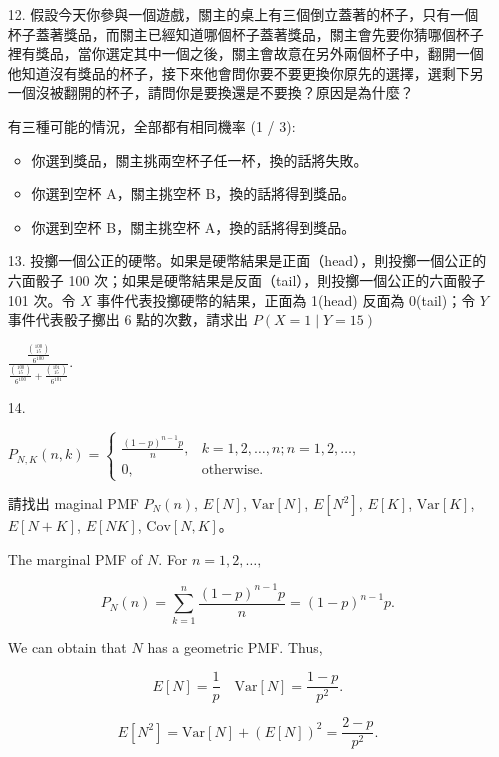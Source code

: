 \documentclass{article}
\begin{document}
\begin{enumerate}
    \item [12.] 假設今天你參與一個遊戲，關主的桌上有三個倒立蓋著的杯子，只有一個杯子蓋著獎品，而關主已經知道哪個杯子蓋著獎品，關主會先要你猜哪個杯子裡有獎品，當你選定其中一個之後，關主會故意在另外兩個杯子中，翻開一個他知道沒有獎品的杯子，接下來他會問你要不要更換你原先的選擇，選剩下另一個沒被翻開的杯子，請問你是要換還是不要換？原因是為什麼？

    有三種可能的情況，全部都有相同機率 (1 / 3):

    \begin{itemize}
        \item 你選到獎品，關主挑兩空杯子任一杯，換的話將失敗。
        \item 你選到空杯 A，關主挑空杯 B，換的話將得到獎品。
        \item 你選到空杯 B，關主挑空杯 A，換的話將得到獎品。
    \end{itemize}
        
    \item [13.] 投擲一個公正的硬幣。如果是硬幣結果是正面（head），則投擲一個公正的六面骰子 100 次；如果是硬幣結果是反面（tail），則投擲一個公正的六面骰子 101 次。令 $X$ 事件代表投擲硬幣的結果，正面為 1(head) 反面為 0(tail)；令 $Y$ 事件代表骰子擲出 6 點的次數，請求出 $P(X = 1 \mid Y = 15)$

    $\frac{\frac{\binom{100}{15}}{6^{100}}}{\frac{\binom{100}{15}}{6^{100}} + \frac{\binom{101}{15}}{6^{101}}}.$

    \item [14.] 
    
    $P_{N, K}(n, k) = 
    \begin{cases}
        \frac{(1 - p)^{n - 1}p}{n}, & k = 1, 2, \dots, n; n = 1, 2, \dots, \\
        0, & \text{otherwise}.
    \end{cases}
    $

    請找出 maginal PMF $P_N(n)$, $E[N]$, $\text{Var}[N]$, $E[N^2]$, $E[K]$, $\text{Var}[K]$, $E[N + K]$, $E[NK]$, $\text{Cov}[N, K]$。

    The marginal PMF of $N$. For $n = 1, 2, \dots,$

    $$P_N(n) = \sum_{k = 1}^n \frac{(1 - p)^{n - 1}p}{n} = (1 - p)^{n - 1}p.$$

    We can obtain that $N$ has a geometric PMF. Thus,

    $$E[N] = \frac{1}{p} \quad \text{Var}[N] = \frac{1 - p}{p^2}.$$

    $$E[N^2] = \text{Var}[N] + (E[N])^2 = \frac{2 - p}{p^2}.$$


\end{enumerate}
\end{document}

